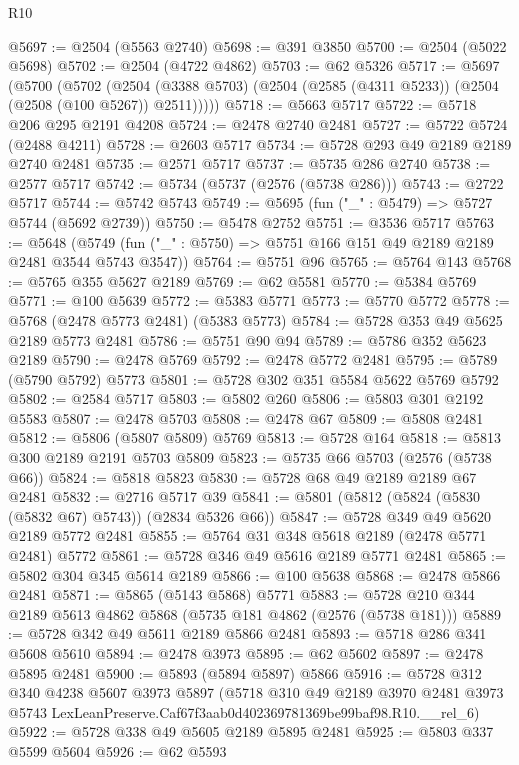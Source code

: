\begin{lexlean}{R10}
\begin{coremodule}
@5697 := @2504 (@5563 @2740)
@5698 := @391 @3850
@5700 := @2504 (@5022 @5698)
@5702 := @2504 (@4722 @4862)
@5703 := @62 @5326
@5717 := @5697
    (@5700
      (@5702
        (@2504 (@3388 @5703) (@2504 (@2585 (@4311 @5233)) (@2504 (@2508 (@100 @5267)) @2511)))))
@5718 := @5663 @5717
@5722 := @5718 @206 @295 @2191 @4208
@5724 := @2478 @2740 @2481
@5727 := @5722 @5724 (@2488 @4211)
@5728 := @2603 @5717
@5734 := @5728 @293 @49 @2189 @2189 @2740 @2481
@5735 := @2571 @5717
@5737 := @5735 @286 @2740
@5738 := @2577 @5717
@5742 := @5734 (@5737 (@2576 (@5738 @286)))
@5743 := @2722 @5717
@5744 := @5742 @5743
@5749 := @5695 (fun ("_" : @5479) => @5727 @5744 (@5692 @2739))
@5750 := @5478 @2752
@5751 := @3536 @5717
@5763 := @5648
    (@5749 (fun ("_" : @5750) => @5751 @166 @151 @49 @2189 @2189 @2481 @3544 @5743 @3547))
@5764 := @5751 @96
@5765 := @5764 @143
@5768 := @5765 @355 @5627 @2189
@5769 := @62 @5581
@5770 := @5384 @5769
@5771 := @100 @5639
@5772 := @5383 @5771
@5773 := @5770 @5772
@5778 := @5768 (@2478 @5773 @2481) (@5383 @5773)
@5784 := @5728 @353 @49 @5625 @2189 @5773 @2481
@5786 := @5751 @90 @94
@5789 := @5786 @352 @5623 @2189
@5790 := @2478 @5769
@5792 := @2478 @5772 @2481
@5795 := @5789 (@5790 @5792) @5773
@5801 := @5728 @302 @351 @5584 @5622 @5769 @5792
@5802 := @2584 @5717
@5803 := @5802 @260
@5806 := @5803 @301 @2192 @5583
@5807 := @2478 @5703
@5808 := @2478 @67
@5809 := @5808 @2481
@5812 := @5806 (@5807 @5809) @5769
@5813 := @5728 @164
@5818 := @5813 @300 @2189 @2191 @5703 @5809
@5823 := @5735 @66 @5703 (@2576 (@5738 @66))
@5824 := @5818 @5823
@5830 := @5728 @68 @49 @2189 @2189 @67 @2481
@5832 := @2716 @5717 @39
@5841 := @5801 (@5812 (@5824 (@5830 (@5832 @67) @5743)) (@2834 @5326 @66))
@5847 := @5728 @349 @49 @5620 @2189 @5772 @2481
@5855 := @5764 @31 @348 @5618 @2189 (@2478 @5771 @2481) @5772
@5861 := @5728 @346 @49 @5616 @2189 @5771 @2481
@5865 := @5802 @304 @345 @5614 @2189
@5866 := @100 @5638
@5868 := @2478 @5866 @2481
@5871 := @5865 (@5143 @5868) @5771
@5883 := @5728 @210 @344 @2189 @5613 @4862 @5868 (@5735 @181 @4862 (@2576 (@5738 @181)))
@5889 := @5728 @342 @49 @5611 @2189 @5866 @2481
@5893 := @5718 @286 @341 @5608 @5610
@5894 := @2478 @3973
@5895 := @62 @5602
@5897 := @2478 @5895 @2481
@5900 := @5893 (@5894 @5897) @5866
@5916 := @5728
    @312
    @340
    @4238
    @5607
    @3973
    @5897
    (@5718
      @310
      @49
      @2189
      @3970
      @2481
      @3973
      @5743
      LexLeanPreserve.Caf67f3aab0d402369781369be99baf98.R10.__rel_6)
@5922 := @5728 @338 @49 @5605 @2189 @5895 @2481
@5925 := @5803 @337 @5599 @5604
@5926 := @62 @5593

\end{coremodule}
\end{lexlean}
